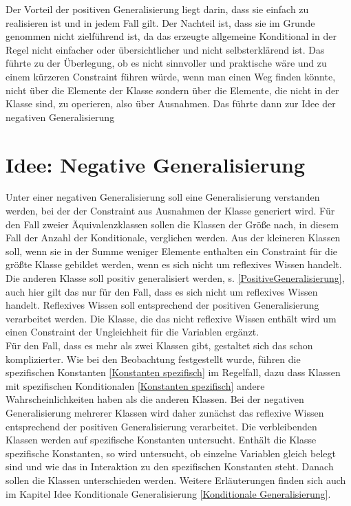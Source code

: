 \documentclass[a4paper, 11pt]{book}
\begin{document}
\noindent
Der Vorteil der positiven Generalisierung liegt darin, dass sie einfach zu realisieren ist und in jedem Fall gilt. Der Nachteil ist, dass sie im Grunde genommen nicht zielführend ist, da das erzeugte allgemeine Konditional in der Regel nicht einfacher oder übersichtlicher und nicht selbsterklärend ist. Das führte zu der Überlegung, ob es nicht sinnvoller und praktische wäre und zu einem kürzeren Constraint führen würde, wenn man einen Weg finden könnte, nicht über die Elemente der Klasse sondern über die Elemente, die nicht in der Klasse sind, zu operieren,  also über Ausnahmen. Das führte dann zur Idee der negativen Generalisierung 

\section{Idee: Negative Generalisierung}
\label{NegativeGeneralisierung}
Unter einer negativen Generalisierung soll eine Generalisierung verstanden werden, bei der der Constraint aus Ausnahmen der Klasse generiert wird. Für den Fall zweier Äquivalenzklassen sollen die Klassen der Größe nach, in diesem Fall der Anzahl der Konditionale, verglichen werden. Aus der kleineren Klassen soll, wenn sie in der Summe weniger Elemente enthalten ein Constraint für die größte Klasse gebildet werden, wenn es sich nicht um reflexives Wissen handelt. Die anderen Klasse soll positiv generalisiert werden, s. \ref{PositiveGeneralisierung}, auch hier gilt das nur für den Fall, dass es sich nicht um reflexives Wissen handelt. Reflexives Wissen soll entsprechend der positiven Generalisierung verarbeitet werden. Die Klasse, die das nicht reflexive Wissen enthält wird um einen Constraint der Ungleichheit für die Variablen ergänzt.\\



Für den Fall, dass es mehr als zwei Klassen gibt, gestaltet sich das schon komplizierter. Wie bei den Beobachtung festgestellt wurde, führen die spezifischen Konstanten \ref{Konstanten spezifisch} im Regelfall, dazu dass Klassen mit spezifischen Konditionalen \ref{Konstanten spezifisch} andere Wahrscheinlichkeiten haben als die anderen Klassen. Bei der negativen Generalisierung mehrerer Klassen wird daher zunächst das reflexive Wissen entsprechend der positiven Generalisierung verarbeitet. Die verbleibenden Klassen werden auf spezifische Konstanten untersucht. Enthält die Klasse spezifische Konstanten, so wird untersucht, ob einzelne Variablen gleich belegt sind und wie das in Interaktion zu den spezifischen Konstanten steht. Danach sollen die Klassen unterschieden werden. Weitere Erläuterungen finden sich auch im Kapitel Idee Konditionale Generalisierung \ref{Konditionale Generalisierung}. \\
\end{document}
